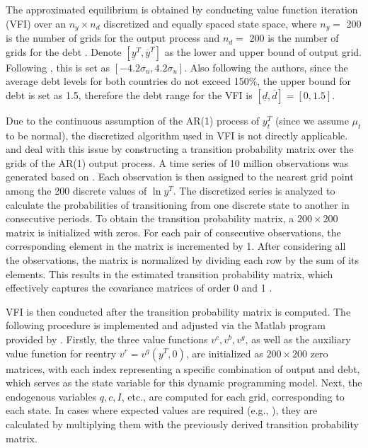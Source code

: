 The approximated equilibrium is obtained by conducting value function iteration (VFI) over an $n_y \times n_d$ discretized and equally spaced state space,
where $n_y = $ 200 is the number of grids for the output process and $n_d=$ 200 is the number of grids for the debt \citep{Na-18}. Denote $[\underline{y}^T, \overline{y}^T]$ as the lower and upper bound of output grid. Following \citet{Uribe-Schmitt-Grohe-textbook}, this is set as $[-4.2 \sigma_u, 4.2 \sigma_u]$. Also following the authors, since the average debt levels for both countries do not exceed 150\%, the upper bound for debt is set as 1.5, therefore the debt range for the VFI is $[\underline{d}, \overline{d}]=[0,1.5]$.

Due to the continuous assumption of the AR(1) process of $y^T_t$ (since we assume $\mu_t$ to be normal), the discretized algorithm used in VFI is not directly applicable. \citet{Schmitt-Uribe-16} and \citet{Na-18} deal with this issue by constructing a transition probability matrix over the grids of the AR(1) output process.
A time series of 10 million observations was generated based on . Each observation is then assigned to the nearest grid point among the 200 discrete values of $\ln y^T$. The discretized series is analyzed to calculate the probabilities of transitioning from one discrete state to another in consecutive periods.
To obtain the transition probability matrix, a $200\times200$ matrix is initialized with zeros. For each pair of consecutive observations, the corresponding element in the matrix is incremented by 1. After considering all the observations, the matrix is normalized by dividing each row by the sum of its elements. This results in the estimated transition probability matrix, which effectively captures the covariance matrices of order 0 and 1
\citep*{Uribe-Schmitt-Grohe-textbook}.

VFI is then conducted after the transition probability matrix is computed. The following procedure is implemented and adjusted via the Matlab program provided by \citet*{Hinrichsen_2020-chapter4}.
Firstly, the three value functions $v^c, v^b, v^g$, as well as the auxiliary value function for reentry $v^r = v^g(y^T, 0)$, are initialized as $200 \times 200 $ zero matrices, with each index representing a specific combination of output and debt, which serves as the state variable for this dynamic programming model. Next, the endogenous variables $q, c, I$, etc., are computed for each grid, corresponding to each state. In cases where expected values are required (e.g., ), they are calculated by multiplying them with the previously derived transition probability matrix.

